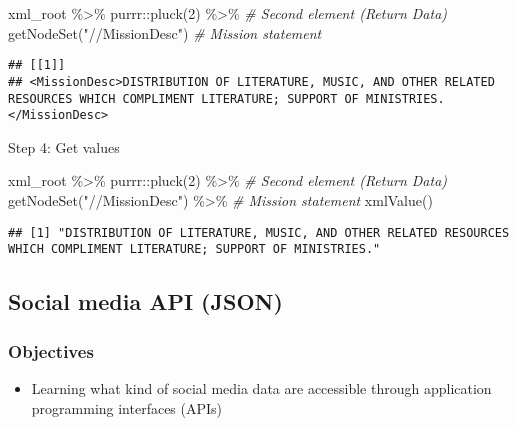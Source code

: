 \documentclass[
]{book}
\newenvironment{Shaded}{\begin{snugshade}}{\end{snugshade}}
\newcommand{\CommentTok}[1]{\textcolor[rgb]{0.56,0.35,0.01}{\textit{#1}}}
\newcommand{\DecValTok}[1]{\textcolor[rgb]{0.00,0.00,0.81}{#1}}
\newcommand{\FunctionTok}[1]{\textcolor[rgb]{0.00,0.00,0.00}{#1}}
\newcommand{\NormalTok}[1]{#1}
\newcommand{\SpecialCharTok}[1]{\textcolor[rgb]{0.00,0.00,0.00}{#1}}
\newcommand{\StringTok}[1]{\textcolor[rgb]{0.31,0.60,0.02}{#1}}
\providecommand{\tightlist}{%
  \setlength{\itemsep}{0pt}\setlength{\parskip}{0pt}}
\begin{document}
\begin{Shaded}
\begin{Highlighting}[]
\NormalTok{xml\_root }\SpecialCharTok{\%\textgreater{}\%}
\NormalTok{  purrr}\SpecialCharTok{::}\FunctionTok{pluck}\NormalTok{(}\DecValTok{2}\NormalTok{) }\SpecialCharTok{\%\textgreater{}\%} \CommentTok{\# Second element (Return Data)}
  \FunctionTok{getNodeSet}\NormalTok{(}\StringTok{"//MissionDesc"}\NormalTok{) }\CommentTok{\# Mission statement }
\end{Highlighting}
\end{Shaded}

\begin{verbatim}
## [[1]]
## <MissionDesc>DISTRIBUTION OF LITERATURE, MUSIC, AND OTHER RELATED RESOURCES WHICH COMPLIMENT LITERATURE; SUPPORT OF MINISTRIES.</MissionDesc>
\end{verbatim}

Step 4: Get values

\begin{Shaded}
\begin{Highlighting}[]
\NormalTok{xml\_root }\SpecialCharTok{\%\textgreater{}\%}
\NormalTok{  purrr}\SpecialCharTok{::}\FunctionTok{pluck}\NormalTok{(}\DecValTok{2}\NormalTok{) }\SpecialCharTok{\%\textgreater{}\%} \CommentTok{\# Second element (Return Data)}
  \FunctionTok{getNodeSet}\NormalTok{(}\StringTok{"//MissionDesc"}\NormalTok{) }\SpecialCharTok{\%\textgreater{}\%} \CommentTok{\# Mission statement }
  \FunctionTok{xmlValue}\NormalTok{()}
\end{Highlighting}
\end{Shaded}

\begin{verbatim}
## [1] "DISTRIBUTION OF LITERATURE, MUSIC, AND OTHER RELATED RESOURCES WHICH COMPLIMENT LITERATURE; SUPPORT OF MINISTRIES."
\end{verbatim}

\hypertarget{social-media-api-json}{%
\subsection{Social media API (JSON)}\label{social-media-api-json}}

\hypertarget{objectives-4}{%
\subsubsection{Objectives}\label{objectives-4}}

\begin{itemize}
\tightlist
\item
  Learning what kind of social media data are accessible through application programming interfaces (APIs)
\end{itemize}
\end{document}
